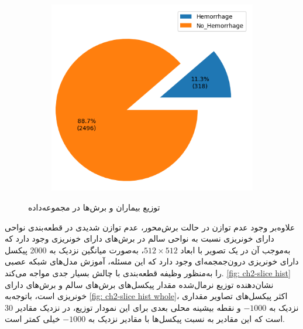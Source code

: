 \begin{figure}[ht]
\begin{subfigure}{0.45\textwidth}
			\includegraphics[width=\linewidth,]{Images/Chapter2/slice distribution.png}
			\caption{}
			\label{fig: ch2-slice distribution}
		\end{subfigure}
		\caption{توزیع بیماران و برش‌ها در مجموعه‌داده 
		}
		\label{fig: ch2-distribution}
\end{figure} 

 علاوه‌بر وجود عدم توازن در حالت برش‌محور، عدم توازن شدیدی در قطعه‌بندی نواحی دارای خونریزی نسبت به نواحی سالم در برش‌های دارای خونریزی وجود دارد که به‌موجب آن در یک تصویر با ابعاد
$512\times512$،
به‌صورت میانگین نزدیک به 2000 پیکسل
دارای خونریزی درون‌جمجمه‌ای وجود دارد که این مسئله، آموزش مدل‌های شبکه عصبی را به‌منظور وظیفه قطعه‌بندی با چالش بسیار جدی مواجه می‌کند. 
\autoref{fig: ch2-slice hist}
نشان‌دهنده توزیع نرمال‌شده 
مقدار پیکسل‌های برش‌های سالم و برش‌های دارای خونریزی است، باتوجه‌به
\autoref{fig: ch2-slice hist whole}، 
اکثر پیکسل‌های تصاویر مقداری نزدیک به 
$-1000$
و نقطه بیشینه محلی بعدی برای این نمودار توزیع، در نزدیک مقادیر 30 است که این مقادیر به نسبت پیکسل‌ها با مقادیر نزدیک به 
$-1000$
خیلی کمتر است.


